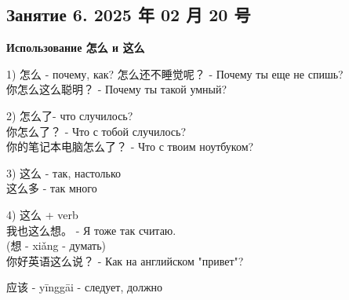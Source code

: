 \newpage
\subsection{Занятие 6. 2025 年 02 月 20 号}
\textbf{Использование 怎么 и 这么}

1) 怎么 - почему, как?
怎么还不睡觉呢？ - Почему ты еще не спишь?\\
你怎么这么聪明？ - Почему ты такой умный?

2) 怎么了- что случилось?\\
你怎么了？ - Что с тобой случилось?\\
你的笔记本电脑怎么了？ - Что с твоим ноутбуком?

3) 这么 - так, настолько\\
这么多 - так много

4) 这么 + verb\\
我也这么想。 - Я тоже так считаю.\\
(想 - xiǎng - думать)\\

你好英语这么说？ - Как на английском "привет"?\\

\begin{newword}
	应该 - yīnggāi - следует, должно
\end{newword}